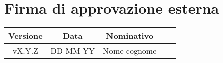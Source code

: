 \section*{Firma di approvazione esterna}
    \begin{table}[h]
        \centering
        \renewcommand{\arraystretch}{1.5}
        \begin{tabularx}{0.98\textwidth}
            {c c c >{\centering\arraybackslash}X X}
            \rowcolor{black}
            \textbf{\color{white} Versione} & \textbf{\color{white} Data} & \textbf{\color{white} Nominativo} & \multicolumn{2}{c}{\textbf{\color{white} Firma}}\\ 
            \hline
            
            \multirow{2}{*}{vX.Y.Z} &\multirow{2}{*}{DD-MM-YY} &\multirow{2}{*}{Nome cognome} &&\\

            &&&\multicolumn{2}{c}{\hrulefill}\\
            \hline
        \end{tabularx}
    \end{table}